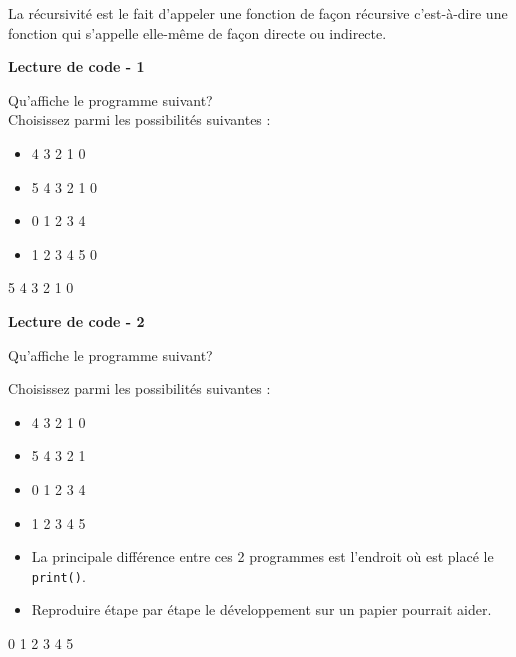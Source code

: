     La récursivité est le fait d'appeler une fonction de façon récursive c'est-à-dire une fonction qui s'appelle elle-même de façon directe ou indirecte. \\
    
	\begin{Exercice}[5 minutes] \textbf{Lecture de code - 1} 
	
	Qu'affiche le programme suivant? \\ 
	
	 
	
	Choisissez parmi les possibilités suivantes : \\
	
	\begin{itemize}
	\item 4  
	3 
	2 
	1 
	0 
	\item 5 
	4 
	3 
	2 
    1 
    0
	\item 0 
	1 
	2 
	3 
	4 
	\item 1 
	2 
	3 
	4
    5
    0
    \end{itemize}
    \begin{solution} 
			5  
			4  
			3  
			2  
			1  
			0  
		\end{solution} 
    
\end{Exercice}

\begin{Exercice}[5 minutes] \textbf{Lecture de code - 2}
    
	Qu'affiche le programme suivant?
	
	
	Choisissez parmi les possibilités suivantes : \\
	
	\begin{itemize}
	\item 4  
	3 
	2 
	1 
	0 
	\item 5 
	4 
	3 
	2 
	1 
	\item 0 
	1 
	2 
	3 
	4 
	\item 1 
	2 
	3 
	4 
	5
	\end{itemize}
	
	 
	
		\begin{conseil} 
		\begin{itemize} 
			\item La principale différence entre ces 2 programmes est l'endroit où est placé le \lstinline{print()}. 
			\item Reproduire étape par étape le développement sur un papier pourrait aider. 
		\end{itemize} 
		\end{conseil} 
	
		\begin{solution} 
			0  
			1  
			2  
			3  
			4  
			5 
	
		\end{solution} 
	
	\end{Exercice}
	
